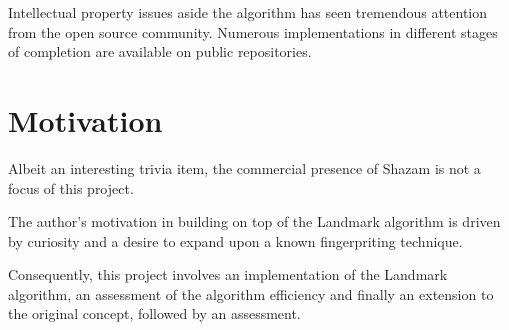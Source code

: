 Intellectual property issues aside the algorithm has seen tremendous attention from the open source community. Numerous implementations in different stages of completion are available on public repositories.

\section{Motivation}
Albeit an interesting trivia item, the commercial presence of Shazam is not a focus of this project. 

The author's motivation in building on top of the Landmark algorithm is driven by curiosity and a desire to expand upon a known fingerpriting technique. 

Consequently, this project involves an implementation of the Landmark algorithm, an assessment of the algorithm efficiency and finally an extension to the original concept, followed by an assessment.






